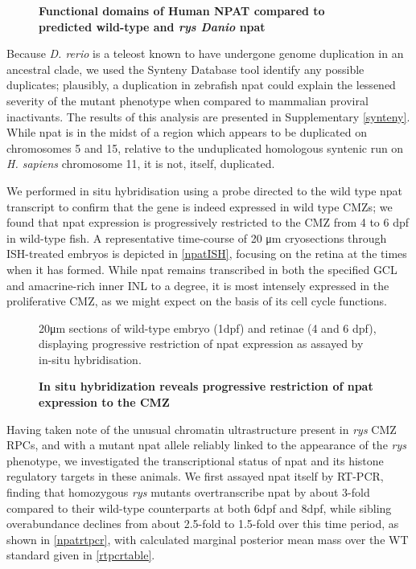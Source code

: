 \begin{figure}[!h]
    \caption{{\bf Functional domains of Human NPAT compared to predicted wild-type and \textit{rys Danio} npat}}
    \label{npatprotein}
\end{figure}
\FloatBarrier

Because \textit{D. rerio} is a teleost known to have undergone genome duplication in an ancestral clade, we used the Synteny Database tool \cite{Catchen2009} identify any possible duplicates; plausibly, a duplication in zebrafish npat could explain the lessened severity of the mutant phenotype when compared to mammalian proviral inactivants. The results of this analysis are presented in Supplementary \autoref{synteny}. While npat is in the midst of a region which appears to be duplicated on chromosomes 5 and 15, relative to the unduplicated homologous syntenic run on \textit{H. sapiens} chromosome 11, it is not, itself, duplicated.

We performed in situ hybridisation using a probe directed to the wild type npat transcript to confirm that the gene is indeed expressed in wild type CMZs; we found that npat expression is progressively restricted to the CMZ from 4 to 6 dpf in wild-type fish. A representative time-course of 20 \si{\micro\metre} cryosections through ISH-treated embryos is depicted in \autoref{npatISH}, focusing on the retina at the times when it has formed. While npat remains transcribed in both the specified GCL and amacrine-rich inner INL to a degree, it is most intensely expressed in the proliferative CMZ, as we might expect on the basis of its cell cycle functions.

\begin{figure}[!h]
    \caption{{\bf In situ hybridization reveals progressive restriction of npat expression to the CMZ}}
    20\si{\micro\metre} sections of wild-type embryo (1dpf) and retinae (4 and 6 dpf), displaying progressive restriction of npat expression as assayed by in-situ hybridisation.
    \label{npatISH}
\end{figure}

Having taken note of the unusual chromatin ultrastructure present in \textit{rys} CMZ RPCs, and with a mutant npat allele reliably linked to the appearance of the \textit{rys} phenotype, we investigated the transcriptional status of npat and its histone regulatory targets in these animals. We first assayed npat itself by RT-PCR, finding that homozygous \textit{rys} mutants overtranscribe npat by about 3-fold compared to their wild-type counterparts at both 6dpf and 8dpf, while sibling overabundance declines from about 2.5-fold to 1.5-fold over this time period, as shown in \autoref{npatrtpcr}, with calculated marginal posterior mean mass over the WT standard given in \autoref{rtpcrtable}.

